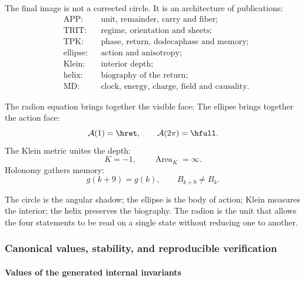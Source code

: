 The final image is not a corrected circle. It is an architecture of
publications:
\[
\begin{aligned}
&\text{APP:}&&\text{unit, remainder, carry and fiber};\\
&\text{TRIT:}&&\text{regime, orientation and sheets};\\
&\text{TPK:}&&\text{phase, return, dodecaphase and memory};\\
&\text{ellipse:}&&\text{action and anisotropy};\\
&\text{Klein:}&&\text{interior depth};\\
&\text{helix:}&&\text{biography of the return};\\
&\text{MD:}&&\text{clock, energy, charge, field and causality}.
\end{aligned}
\]

The radion equation brings together the visible face:
\BigRadionEquation
The ellipse brings together the action face:
\[
\mathcal A(1)=\hret,\qquad \mathcal A(2\pi)=\hfull.
\]
The Klein metric unites the depth:
\[
K=-1,\qquad \operatorname{Area}_K=\infty.
\]
Holonomy gathers memory:
\[
g(k+9)=g(k),\qquad B_{k+9}\ne B_k.
\]

\begin{thesisbox}
The circle is the angular shadow; the ellipse is the body of action; Klein measures
the interior; the helix preserves the biography. The radion is the unit that
allows the four statements to be read on a single state without reducing one
to another.
\end{thesisbox}
\subsubsection{Canonical values, stability, and reproducible verification}

\paragraph{Values of the generated internal invariants}


